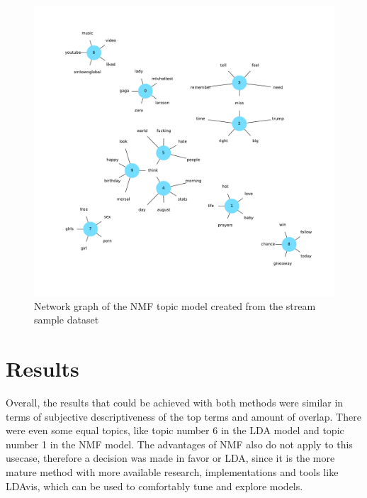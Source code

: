 \begin{figure}
    \centering
    \caption{Network graph of the NMF topic model created from the stream sample dataset}
    \label{fig:nmf_network_graph}
    \includegraphics[width=\textwidth]{../figures/nmf_network_graph.pdf}
\end{figure}

\section{Results}
\label{sec:results}

Overall, the results that could be achieved with both methods were similar in terms of subjective descriptiveness of the top terms and amount of overlap.
There were even some equal topics, like topic number 6 in the LDA model and topic number 1 in the NMF model.
The advantages of NMF also do not apply to this usecase, therefore a decision was made in favor or LDA,
since it is the more mature method with more available research, implementations and tools like LDAvis, which can be used to comfortably
tune and explore models.
